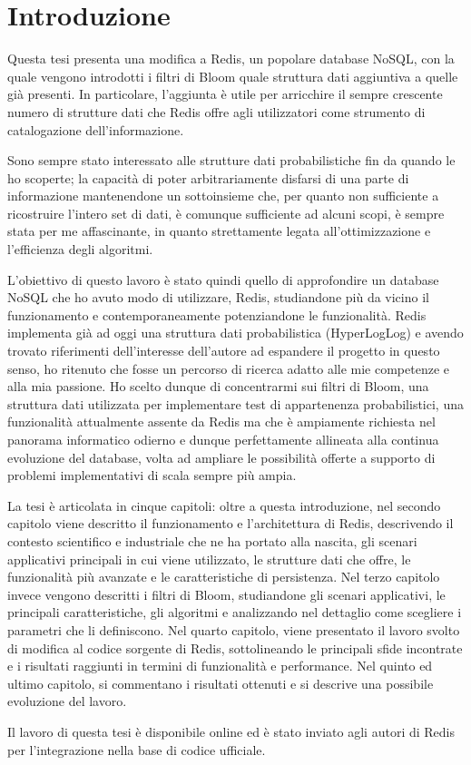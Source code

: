 \chapter{Introduzione}

Questa tesi presenta una modifica a Redis, un popolare database NoSQL, con la quale vengono
introdotti i filtri di Bloom quale struttura dati aggiuntiva a quelle già presenti. In particolare,
l'aggiunta è utile per arricchire il sempre crescente numero di strutture dati che Redis offre agli
utilizzatori come strumento di catalogazione dell'informazione.

Sono sempre stato interessato alle strutture dati probabilistiche fin da quando le ho scoperte; la
capacità di poter arbitrariamente disfarsi di una parte di informazione mantenendone un sottoinsieme
che, per quanto non sufficiente a ricostruire l'intero set di dati, è comunque sufficiente ad alcuni
scopi, è sempre stata per me affascinante, in quanto strettamente legata all'ottimizzazione e
l'efficienza degli algoritmi.

L'obiettivo di questo lavoro è stato quindi quello di approfondire un database NoSQL che ho avuto
modo di utilizzare, Redis, studiandone più da vicino il funzionamento e contemporaneamente
potenziandone le funzionalità. Redis implementa già ad oggi una struttura dati probabilistica
(HyperLogLog) e avendo trovato riferimenti dell'interesse dell'autore ad espandere il progetto in
questo senso, ho ritenuto che fosse un percorso di ricerca adatto alle mie competenze e alla mia
passione. Ho scelto dunque di concentrarmi sui filtri di Bloom, una struttura dati utilizzata
per implementare test di appartenenza probabilistici, una funzionalità attualmente assente da
Redis ma che è ampiamente richiesta nel panorama informatico odierno e dunque perfettamente
allineata alla continua evoluzione del database, volta ad ampliare le possibilità offerte a
supporto di problemi implementativi di scala sempre più ampia.

La tesi è articolata in cinque capitoli: oltre a questa introduzione, nel secondo capitolo viene
descritto il funzionamento e l'architettura di Redis, descrivendo il contesto scientifico e
industriale che ne ha portato alla nascita, gli scenari applicativi principali in cui viene
utilizzato, le strutture dati che offre, le funzionalità più avanzate e le caratteristiche di
persistenza. Nel terzo capitolo invece vengono descritti i filtri di Bloom, studiandone gli scenari
applicativi, le principali caratteristiche, gli algoritmi e analizzando nel dettaglio come scegliere
i parametri che li definiscono. Nel quarto capitolo, viene presentato il lavoro svolto di modifica
al codice sorgente di Redis, sottolineando le principali sfide incontrate e i risultati raggiunti in
termini di funzionalità e performance. Nel quinto ed ultimo capitolo, si commentano i risultati
ottenuti e si descrive una possibile evoluzione del lavoro.

Il lavoro di questa tesi è disponibile online ed è stato inviato agli autori di Redis per
l'integrazione nella base di codice ufficiale.
